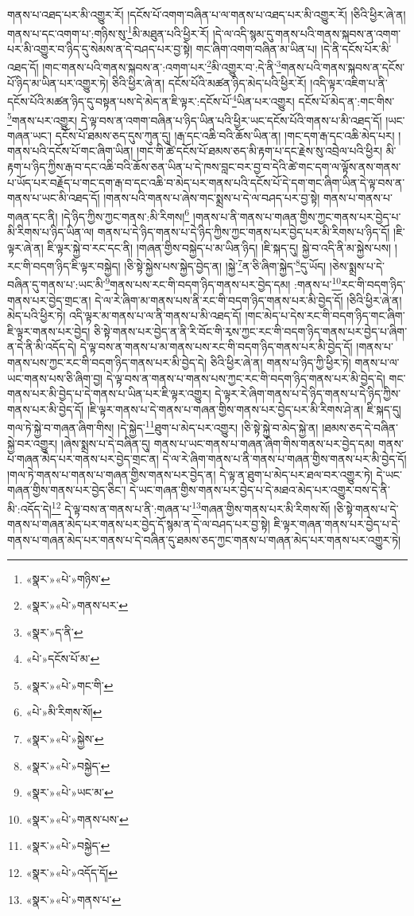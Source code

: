 གནས་པ་འཐད་པར་མི་འགྱུར་རོ། །དངོས་པོ་འགག་བཞིན་པ་ལ་གནས་པ་འཐད་པར་མི་འགྱུར་རོ། །ཅིའི་ཕྱིར་ཞེ་ན། གནས་པ་དང་འགག་པ་:གཉིས་སུ་\footnote{«སྣར་»«པེ་»གཉིས་}མི་མཐུན་པའི་ཕྱིར་རོ། །དེ་ལ་འདི་སྙམ་དུ་གནས་པའི་གནས་སྐབས་ན་འགག་པར་མི་འགྱུར་བ་ཉིད་དུ་སེམས་ན་དེ་བཤད་པར་བྱ་སྟེ། གང་ཞིག་འགག་བཞིན་མ་ཡིན་པ། །དེ་ནི་དངོས་པོར་མི་འཐད་དོ། །གང་གནས་པའི་གནས་སྐབས་ན་:འགག་པར་\footnote{«སྣར་»«པེ་»གནས་པར་}མི་འགྱུར་བ་:དེ་ནི་\footnote{«སྣར་»ད་ནི་}གནས་པའི་གནས་སྐབས་ན་དངོས་པོ་ཉིད་མ་ཡིན་པར་འགྱུར་ཏེ། ཅིའི་ཕྱིར་ཞེ་ན། དངོས་པོའི་མཚན་ཉིད་མེད་པའི་ཕྱིར་རོ། །འདི་ལྟར་འཇིག་པ་ནི་དངོས་པོའི་མཚན་ཉིད་དུ་བསྟན་པས་དེ་མེད་ན་ཇི་ལྟར་:དངོས་པོ་\footnote{«པེ་»དངོས་པོ་མ་}ཡིན་པར་འགྱུར། དངོས་པོ་མེད་ན་:གང་གིས་\footnote{«སྣར་»«པེ་»གང་གི་}གནས་པར་འགྱུར། དེ་ལྟ་བས་ན་འགག་བཞིན་པ་ཉིད་ཡིན་པའི་ཕྱིར་ཡང་དངོས་པོའི་གནས་པ་མི་འཐད་དོ། །ཡང་གཞན་ཡང་། དངོས་པོ་ཐམས་ཅད་དུས་ཀུན་དུ། །རྒ་དང་འཆི་བའི་ཆོས་ཡིན་ན། །གང་དག་རྒ་དང་འཆི་མེད་པར། །གནས་པའི་དངོས་པོ་གང་ཞིག་ཡིན། །གང་གི་ཚེ་དངོས་པོ་ཐམས་ཅད་མི་རྟག་པ་དང་རྗེས་སུ་འབྲེལ་པའི་ཕྱིར། མི་རྟག་པ་ཉིད་ཀྱིས་རྒ་བ་དང་འཆི་བའི་ཆོས་ཅན་ཡིན་པ་དེ་ཁས་བླང་བར་བྱ་བ་དེའི་ཚེ་གང་དག་ལ་ལྟོས་ནས་གནས་པ་ཡོད་པར་བརྗོད་པ་གང་དག་རྒ་བ་དང་འཆི་བ་མེད་པར་གནས་པའི་དངོས་པོ་དེ་དག་གང་ཞིག་ཡིན་དེ་ལྟ་བས་ན་གནས་པ་ཡང་མི་འཐད་དོ། །གནས་པའི་གནས་པ་ཞེས་གང་སྨྲས་པ་དེ་ལ་བཤད་པར་བྱ་སྟེ། གནས་པ་གནས་པ་གཞན་དང་ནི། །དེ་ཉིད་ཀྱིས་ཀྱང་གནས་:མི་རིགས།\footnote{«པེ་»མི་རིགས་སོ།} །གནས་པ་ནི་གནས་པ་གཞན་གྱིས་ཀྱང་གནས་པར་བྱེད་པ་མི་རིགས་པ་ཉིད་ཡིན་ལ། གནས་པ་དེ་ཉིད་གནས་པ་དེ་ཉིད་ཀྱིས་ཀྱང་གནས་པར་བྱེད་པར་མི་རིགས་པ་ཉིད་དོ། །ཇི་ལྟར་ཞེ་ན། ཇི་ལྟར་སྐྱེ་བ་རང་དང་ནི། །གཞན་གྱིས་བསྐྱེད་པ་མ་ཡིན་ཉིད། །ཇི་སྐད་དུ། སྐྱེ་བ་འདི་ནི་མ་སྐྱེས་པས། །རང་གི་བདག་ཉིད་ཇི་ལྟར་བསྐྱེད། །ཅི་སྟེ་སྐྱེས་པས་སྐྱེད་བྱེད་ན། །སྐྱེ་\footnote{«སྣར་»«པེ་»སྐྱེས་}ན་ཅི་ཞིག་སྐྱེད་\footnote{«སྣར་»«པེ་»བསྐྱེད་}དུ་ཡོད། །ཅེས་སྨྲས་པ་དེ་བཞིན་དུ་གནས་པ་:ཡང་མི་\footnote{«སྣར་»«པེ་»ཡང་མ་}གནས་པས་རང་གི་བདག་ཉིད་གནས་པར་བྱེད་དམ། :གནས་པ་\footnote{«སྣར་»«པེ་»གནས་པས་}རང་གི་བདག་ཉིད་གནས་པར་བྱེད་གྲང་ན། དེ་ལ་རེ་ཞིག་མ་གནས་པས་ནི་རང་གི་བདག་ཉིད་གནས་པར་མི་བྱེད་དོ། །ཅིའི་ཕྱིར་ཞེ་ན། མེད་པའི་ཕྱིར་ཏེ། འདི་ལྟར་མ་གནས་པ་ལ་ནི་གནས་པ་མི་འཐད་དོ། །གང་མེད་པ་དེས་རང་གི་བདག་ཉིད་གང་ཞིག་ཇི་ལྟར་གནས་པར་བྱེད། ཅི་སྟེ་གནས་པར་བྱེད་ན་ནི་རི་བོང་གི་རྭས་ཀྱང་རང་གི་བདག་ཉིད་གནས་པར་བྱེད་པ་ཞིག་ན་དེ་ནི་མི་འདོད་དེ། དེ་ལྟ་བས་ན་གནས་པ་མ་གནས་པས་རང་གི་བདག་ཉིད་གནས་པར་མི་བྱེད་དོ། །གནས་པ་གནས་པས་ཀྱང་རང་གི་བདག་ཉིད་གནས་པར་མི་བྱེད་དེ། ཅིའི་ཕྱིར་ཞེ་ན། གནས་པ་ཉིད་ཀྱི་ཕྱིར་ཏེ། གནས་པ་ལ་ཡང་གནས་པས་ཅི་ཞིག་བྱ། དེ་ལྟ་བས་ན་གནས་པ་གནས་པས་ཀྱང་རང་གི་བདག་ཉིད་གནས་པར་མི་བྱེད་དེ། གང་གནས་པར་མི་བྱེད་པ་དེ་གནས་པ་ཡིན་པར་ཇི་ལྟར་འགྱུར། དེ་ལྟར་རེ་ཞིག་གནས་པ་དེ་ཉིད་གནས་པ་དེ་ཉིད་ཀྱིས་གནས་པར་མི་བྱེད་དོ། །ཇི་ལྟར་གནས་པ་དེ་གནས་པ་གཞན་གྱིས་གནས་པར་བྱེད་པར་མི་རིགས་ཤེ་ན། ཇི་སྐད་དུ། གལ་ཏེ་སྐྱེ་བ་གཞན་ཞིག་གིས། །དེ་སྐྱེད་\footnote{«སྣར་»«པེ་»བསྐྱེད་}ཐུག་པ་མེད་པར་འགྱུར། །ཅི་སྟེ་སྐྱེ་བ་མེད་སྐྱེ་ན། །ཐམས་ཅད་དེ་བཞིན་སྐྱེ་བར་འགྱུར། །ཞེས་སྨྲས་པ་དེ་བཞིན་དུ། གནས་པ་ཡང་གནས་པ་གཞན་ཞིག་གིས་གནས་པར་བྱེད་དམ། གནས་པ་གཞན་མེད་པར་གནས་པར་བྱེད་གྲང་ན། དེ་ལ་རེ་ཞིག་གནས་པ་ནི་གནས་པ་གཞན་གྱིས་གནས་པར་མི་བྱེད་དོ། །གལ་ཏེ་གནས་པ་གནས་པ་གཞན་གྱིས་གནས་པར་བྱེད་ན། དེ་ལྟ་ན་ཐུག་པ་མེད་པར་ཐལ་བར་འགྱུར་ཏེ། དེ་ཡང་གཞན་གྱིས་གནས་པར་བྱེད་ཅིང་། དེ་ཡང་གཞན་གྱིས་གནས་པར་བྱེད་པ་དེ་མཐའ་མེད་པར་འགྱུར་བས་དེ་ནི་མི་:འདོད་དེ།\footnote{«སྣར་»«པེ་»འདོད་དོ།} དེ་ལྟ་བས་ན་གནས་པ་ནི་:གཞན་པ་\footnote{«སྣར་»«པེ་»གནས་པ་}གཞན་གྱིས་གནས་པར་མི་རིགས་སོ། །ཅི་སྟེ་གནས་པ་དེ་གནས་པ་གཞན་མེད་པར་གནས་པར་བྱེད་དོ་སྙམ་ན་དེ་ལ་བཤད་པར་བྱ་སྟེ། ཇི་ལྟར་གཞན་གནས་པར་བྱེད་པ་དེ་གནས་པ་གཞན་མེད་པར་གནས་པ་དེ་བཞིན་དུ་ཐམས་ཅད་ཀྱང་གནས་པ་གཞན་མེད་པར་གནས་པར་འགྱུར་ཏེ། 